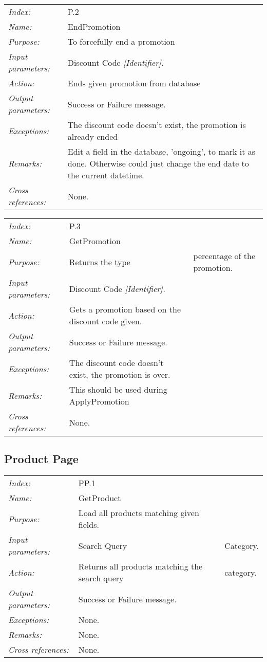 \documentclass[10pt,letter]{article}
\begin{document}
\begin{tabularx}{\textwidth}{l X}
    \it{Index:} & P.2 \\
    \it{Name:} & EndPromotion \\
    \it{Purpose:} & To forcefully end a promotion \\
    \it{Input parameters:} & Discount Code \it{[Identifier]}.\\
    \it{Action:} & Ends given promotion from database\\
    \it{Output parameters:} & Success or Failure message. \\
    \it{Exceptions:} & The discount code doesn't exist, the promotion is already ended \\
    \it{Remarks:} & Edit a field in the database, 'ongoing', to mark it as done. Otherwise could just change the end date to the current datetime.\\
    \it{Cross references:} & None. \\
    \hline
\end{tabularx}

\begin{tabularx}{\textwidth}{l X}
    \it{Index:} & P.3 \\
    \it{Name:} & GetPromotion \\
    \it{Purpose:} & Returns the type & percentage of the promotion. \\
    \it{Input parameters:} & Discount Code \it{[Identifier]}.\\
    \it{Action:} & Gets a promotion based on the discount code given.\\
    \it{Output parameters:} & Success or Failure message. \\
    \it{Exceptions:} & The discount code doesn't exist, the promotion is over. \\
    \it{Remarks:} & This should be used during ApplyPromotion\\
    \it{Cross references:} & None. \\
    \hline
\end{tabularx}

\subsection{Product Page}

\begin{tabularx}{\textwidth}{l X}
    \it{Index:} & PP.1 \\
    \it{Name:} & GetProduct \\
    \it{Purpose:} & Load all products matching given fields.\\
    \it{Input parameters:} & Search Query & Category.\\
    \it{Action:} & Returns all products matching the search query & category.\\
    \it{Output parameters:} & Success or Failure message. \\
    \it{Exceptions:} & None. \\
    \it{Remarks:} & None. \\
    \it{Cross references:} & None. \\
    \hline
\end{tabularx}
\end{document}
